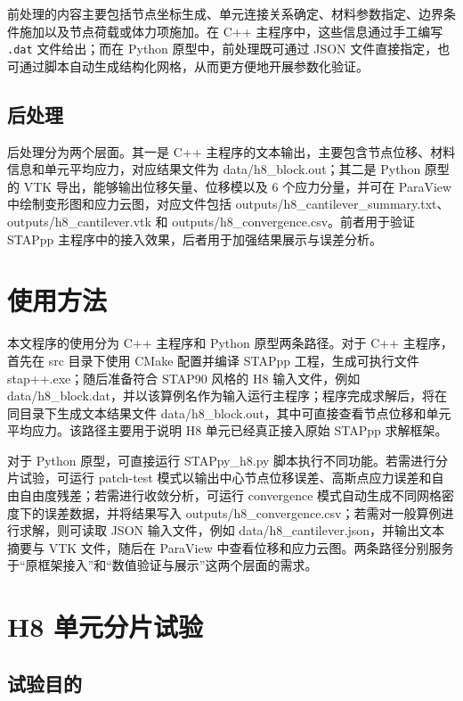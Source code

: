 \documentclass[12pt,a4paper]{article}
\begin{document}
前处理的内容主要包括节点坐标生成、单元连接关系确定、材料参数指定、边界条件施加以及节点荷载或体力项施加。在 C++ 主程序中，这些信息通过手工编写 \texttt{.dat} 文件给出；而在 Python 原型中，前处理既可通过 JSON 文件直接指定，也可通过脚本自动生成结构化网格，从而更方便地开展参数化验证。

\subsection{后处理}

后处理分为两个层面。其一是 C++ 主程序的文本输出，主要包含节点位移、材料信息和单元平均应力，对应结果文件为 data/h8\_block.out；其二是 Python 原型的 VTK 导出，能够输出位移矢量、位移模以及 6 个应力分量，并可在 ParaView 中绘制变形图和应力云图，对应文件包括 outputs/h8\_cantilever\_summary.txt、outputs/h8\_cantilever.vtk 和 outputs/h8\_convergence.csv。前者用于验证 STAPpp 主程序中的接入效果，后者用于加强结果展示与误差分析。

\section{使用方法}

本文程序的使用分为 C++ 主程序和 Python 原型两条路径。对于 C++ 主程序，首先在 src 目录下使用 CMake 配置并编译 STAPpp 工程，生成可执行文件 stap++.exe；随后准备符合 STAP90 风格的 H8 输入文件，例如 data/h8\_block.dat，并以该算例名作为输入运行主程序；程序完成求解后，将在同目录下生成文本结果文件 data/h8\_block.out，其中可直接查看节点位移和单元平均应力。该路径主要用于说明 H8 单元已经真正接入原始 STAPpp 求解框架。

对于 Python 原型，可直接运行 STAPpy\_h8.py 脚本执行不同功能。若需进行分片试验，可运行 patch-test 模式以输出中心节点位移误差、高斯点应力误差和自由自由度残差；若需进行收敛分析，可运行 convergence 模式自动生成不同网格密度下的误差数据，并将结果写入 outputs/h8\_convergence.csv；若需对一般算例进行求解，则可读取 JSON 输入文件，例如 data/h8\_cantilever.json，并输出文本摘要与 VTK 文件，随后在 ParaView 中查看位移和应力云图。两条路径分别服务于“原框架接入”和“数值验证与展示”这两个层面的需求。

\section{H8 单元分片试验}

\subsection{试验目的}
\end{document}
